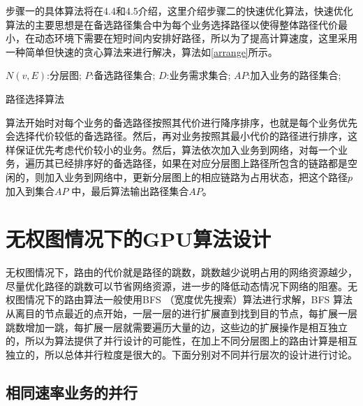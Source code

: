 步骤一的具体算法将在4.4和4.5介绍，这里介绍步骤二的快速优化算法，快速优化算法的主要思想是在备选路径集合中为每个业务选择路径以使得整体路径代价最小，在动态环境下需要在短时间内安排好路径，所以为了提高计算速度，这里采用一种简单但快速的贪心算法来进行解决，算法如\ref{arrange}所示。
\begin{algorithm}[htb]
\begin{algorithmic}[1]
\Require
$N(v,E)$:分层图;
$P$:备选路径集合;
$D$:业务需求集合;
\Ensure
$AP$:加入业务的路径集合;
\EndFor
{}
\EndIf
\EndFor
\EndFor
\end{algorithmic}
\caption{路径选择算法}
\label{arrange}
\end{algorithm}

算法开始时对每个业务的备选路径按照其代价进行降序排序，也就是每个业务优先会选择代价较低的备选路径。然后，再对业务按照其最小代价的路径进行排序，这样保证优先考虑代价较小的业务。然后，算法依次加入业务到网络，对每一个业务，遍历其已经排序好的备选路径，如果在对应分层图上路径所包含的链路都是空闲的，则加入业务到网络中，更新分层图上的相应链路为占用状态，把这个路径$p$ 加入到集合$AP$ 中，最后算法输出路径集合$AP$。
\section{无权图情况下的GPU算法设计}

无权图情况下，路由的代价就是路径的跳数，跳数越少说明占用的网络资源越少，尽量优化路径的跳数可以节省网络资源，进一步的降低动态情况下网络的阻塞。无权图情况下的路由算法一般使用BFS （宽度优先搜索）算法进行求解，BFS 算法从离目的节点最近的点开始，一层一层的进行扩展直到找到目的节点，每扩展一层跳数增加一跳，每扩展一层就需要遍历大量的边，这些边的扩展操作是相互独立的，所以为算法提供了并行设计的可能性，在加上不同分层图上的路由计算是相互独立的，所以总体并行粒度是很大的。下面分别对不同并行层次的设计进行讨论。
\subsection {相同速率业务的并行}

